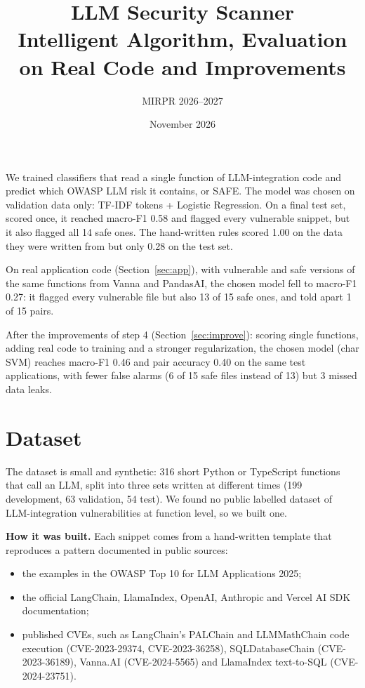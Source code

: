 \documentclass[11pt,a4paper]{article}
\title{\textbf{LLM Security Scanner}\\[4pt]
       \large Intelligent Algorithm, Evaluation on Real Code and Improvements}
\author{MIRPR 2026--2027}   %
\date{November 2026}
\begin{document}
\maketitle

We trained classifiers that read a single function of LLM-integration code and predict
which OWASP LLM risk it contains, or SAFE. The model was chosen on validation data only:
TF-IDF tokens + Logistic Regression. On a final test set, scored once, it reached
macro-F1 0.58 and flagged every vulnerable snippet, but it also flagged all 14 safe ones.
The hand-written rules scored 1.00 on the data they were written from but only 0.28 on
the test set.

On real application code (Section~\ref{sec:app}), with vulnerable and safe versions of
the same functions from Vanna and PandasAI, the chosen model fell to macro-F1 0.27: it
flagged every vulnerable file but also 13 of 15 safe ones, and told apart 1 of 15 pairs.

After the improvements of step 4 (Section~\ref{sec:improve}): scoring single functions,
adding real code to training and a stronger regularization, the chosen model (char SVM)
reaches macro-F1 0.46 and pair accuracy 0.40 on the same test applications, with fewer
false alarms (6 of 15 safe files instead of 13) but 3 missed data leaks.

\section{Dataset}

The dataset is small and synthetic: 316 short Python or TypeScript functions that call an
LLM, split into three sets written at different times (199 development, 63 validation,
54 test). We found no public labelled dataset of LLM-integration vulnerabilities at
function level, so we built one.

\textbf{How it was built.} Each snippet comes from a hand-written template that
reproduces a pattern documented in public sources:
\begin{itemize}
  \item the examples in the OWASP Top 10 for LLM Applications 2025;
  \item the official LangChain, LlamaIndex, OpenAI, Anthropic and Vercel AI SDK documentation;
  \item published CVEs, such as LangChain's PALChain and LLMMathChain code execution
        (CVE-2023-29374, CVE-2023-36258), SQLDatabaseChain (CVE-2023-36189),
        Vanna.AI (CVE-2024-5565) and LlamaIndex text-to-SQL (CVE-2024-23751).
\end{itemize}
\end{document}
